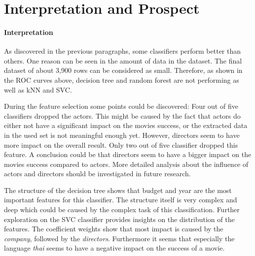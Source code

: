 \section{Interpretation and Prospect}
\paragraph{Interpretation}
As discovered in the previous paragraphs, some classifiers perform better than others. One reason can be seen in the amount of data in the dataset. The final dataset of about 3,900 rows can be considered as small. Therefore, as shown in the ROC curves above, decision tree and random forest are not performing as well as kNN and SVC. %

During the feature selection some points could be discovered: Four out of five classifiers dropped the actors. 
This might be caused by the fact that actors do either not have a significant impact on the movies success, or the extracted data in the used set is not meaningful enough yet. 
However, directors seem to have more impact on the overall result. Only two out of five classifier dropped this feature. A conclusion could be that directors seem to have a bigger impact on the movies success compared to actors. 
More detailed analysis about the influence of actors and directors should be investigated in future research.

The structure of the decision tree shows that budget and year are the most important features for this classifier. The structure itself is very complex and deep which could be caused by the complex task of this classification. 
Further exploration on the SVC classifier provides insights on the distribution of the features. 
The coefficient weights show that most impact is caused by the \textit{company}, followed by the \textit{directors}. Furthermore it seems that especially the language \textit{thai} seems to have a negative impact on the success of a movie.

